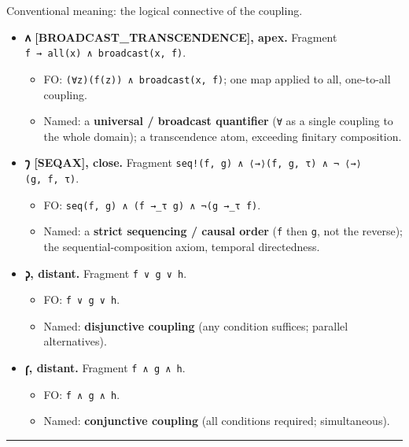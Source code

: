 \documentclass[12pt,a4paper]{article}
\begin{document}
Conventional meaning: the logical connective of the coupling.

\begin{itemize}
\tightlist
\item
  \textbf{𐑵 {[}BROADCAST\_TRANSCENDENCE{]}, apex.} Fragment
  \texttt{f\ →\ all(x)\ ∧\ broadcast(x,\ f)}.

  \begin{itemize}
  \tightlist
  \item
    FO: \texttt{(∀z)(f(z))\ ∧\ broadcast(x,\ f)}; one map applied to
    all, one-to-all coupling.
  \item
    Named: a \textbf{universal / broadcast quantifier} (\texttt{∀} as a
    single coupling to the whole domain); a transcendence atom,
    exceeding finitary composition.
  \end{itemize}
\item
  \textbf{𐑠 {[}SEQAX{]}, close.} Fragment
  \texttt{seq!(f,\ g)\ ∧\ ⟨→⟩(f,\ g,\ τ)\ ∧\ ¬\ ⟨→⟩(g,\ f,\ τ)}.

  \begin{itemize}
  \tightlist
  \item
    FO: \texttt{seq(f,\ g)\ ∧\ (f\ →\_τ\ g)\ ∧\ ¬(g\ →\_τ\ f)}.
  \item
    Named: a \textbf{strict sequencing / causal order} (\texttt{f} then
    \texttt{g}, not the reverse); the sequential-composition axiom,
    temporal directedness.
  \end{itemize}
\item
  \textbf{𐑜, distant.} Fragment \texttt{f\ ∨\ g\ ∨\ h}.

  \begin{itemize}
  \tightlist
  \item
    FO: \texttt{f\ ∨\ g\ ∨\ h}.
  \item
    Named: \textbf{disjunctive coupling} (any condition suffices;
    parallel alternatives).
  \end{itemize}
\item
  \textbf{𐑝, distant.} Fragment \texttt{f\ ∧\ g\ ∧\ h}.

  \begin{itemize}
  \tightlist
  \item
    FO: \texttt{f\ ∧\ g\ ∧\ h}.
  \item
    Named: \textbf{conjunctive coupling} (all conditions required;
    simultaneous).
  \end{itemize}
\end{itemize}

\begin{center}\rule{0.5\linewidth}{0.5pt}\end{center}
\end{document}

